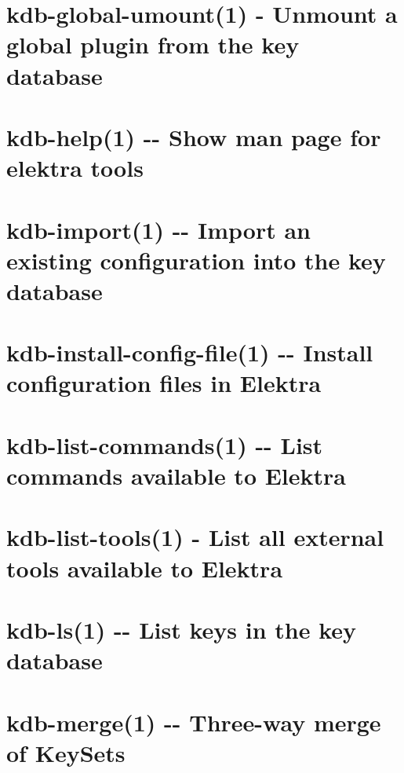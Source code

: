 \documentclass[twoside]{book}
\newcommand{\+}{\discretionary{\mbox{\scriptsize$\hookleftarrow$}}{}{}}
\begin{document}
\chapter{kdb-\/global-\/umount(1) -\/ Unmount a global plugin from the key database}
\label{doc_help_kdb-global-umount_md}

\chapter{kdb-\/help(1) -\/-\/ Show man page for elektra tools}
\label{doc_help_kdb-help_md}

\chapter{kdb-\/import(1) -\/-\/ Import an existing configuration into the key database}
\label{doc_help_kdb-import_md}

\chapter{kdb-\/install-\/config-\/file(1) -\/-\/ Install configuration files in Elektra}
\label{doc_help_kdb-install-config-file_md}

\chapter{kdb-\/list-\/commands(1) -\/-\/ List commands available to Elektra}
\label{doc_help_kdb-list-commands_md}

\chapter{kdb-\/list-\/tools(1) -\/ List all external tools available to Elektra}
\label{doc_help_kdb-list-tools_md}

\chapter{kdb-\/ls(1) -\/-\/ List keys in the key database}
\label{doc_help_kdb-ls_md}

\chapter{kdb-\/merge(1) -\/-\/ Three-\/way merge of Key\+Sets}
\label{doc_help_kdb-merge_md}

\end{document}
